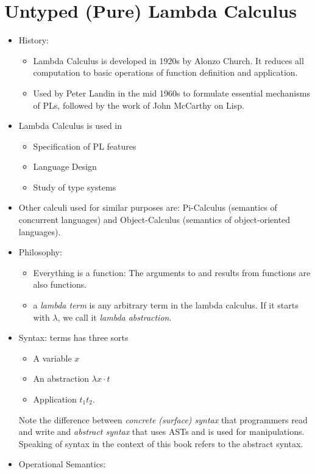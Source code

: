 \documentclass[fleqn]{article}
\begin{document}
\section{Untyped (Pure) Lambda Calculus}
\begin{itemize}
	\item History: 
	\begin{itemize}
		\item Lambda Calculus is developed in 1920s by Alonzo Church. It reduces all computation to 
		basic operations of function definition and application. 
		\item Used by Peter Landin in the mid 1960s to formulate essential mechanisms of PLs, followed 
		by the work of John McCarthy on Lisp. 
	\end{itemize}
	\item Lambda Calculus is used in 
	\begin{itemize}
		\item Specification of PL features 
		\item Language Design 
		\item Study of type systems 
	\end{itemize}
	\item Other calculi used for similar purposes are: Pi-Calculus (semantics of concurrent languages) 
	and Object-Calculus (semantics of object-oriented languages). 
	\item Philosophy: 
	\begin{itemize}
		\item Everything is a function: The arguments to and results from functions are also functions. 
		\item a \emph{lambda term} is any arbitrary term in the lambda calculus. If it starts with $\lambda$, 
		we call it \emph{lambda abstraction}. 
	\end{itemize}
	\item Syntax: terms has three sorts 
	\begin{itemize}
		\item A variable $x$ 
		\item An abstraction $\lambda x \cdot t$ 
		\item Application $t_1 t_2$. 
	\end{itemize}
	Note the difference between \emph{concrete (surface) syntax} that programmers read and write and 
	\emph{abstract syntax} that uses ASTs and is used for manipulations. Speaking of syntax in the 
	context of this book refers to the abstract syntax. 
	\item Operational Semantics: 

\end{itemize}
\end{document}
